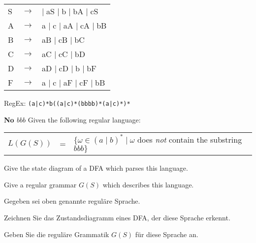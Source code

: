 \documentclass[a4paper]{exam}
\theoremstyle{remark}
\newenvironment{grammar}
	{\begin{tabular}[b]{lcl}}
	{\end{tabular}}
\newcommand{\rewritten}{$\to$}
\newcommand{\alternative}{$\mid \;$}
\begin{document}
\begin{questions}
	\begin{solution}
	
	\begin{grammar}
		S & \rewritten &  \alternative aS \alternative b \alternative bA \alternative cS \\
		A & \rewritten & a \alternative c \alternative aA \alternative cA \alternative bB \\
		B & \rewritten & aB \alternative cB \alternative bC \\
		C & \rewritten & aC \alternative cC \alternative bD \\
		D & \rewritten & aD \alternative cD \alternative b \alternative bF \\
		F & \rewritten & a \alternative c \alternative aF \alternative cF \alternative bB
	\end{grammar}
	
	RegEx: {\tt (a|c)*b((a|c)*(bbbb)*(a|c)*)*}
	
	\end{solution}

\question \textbf{No $bbb$}
	Given the following regular language:
	
	\begin{tabular}[b]{lcl}
		$L(G(S))$ & = & $\{\omega \in (a \mid b)^* \mid \omega$ does {\em not} contain the substring $bbb\}$
	\end{tabular}

	\begin{parts}
		\item Give the state diagram of a DFA which parses this language.

		\item Give a regular grammar $G(S)$ which describes this language.
		
	\end{parts}
	
	\begin{otherlanguage}{german}
		Gegeben sei oben genannte reguläre Sprache.
		
		\begin{parts}
		\item Zeichnen Sie das Zustandsdiagramm eines DFA, der diese Sprache erkennt.

		\item Geben Sie die reguläre Grammatik $G(S)$ für diese Sprache an.
		
	\end{parts}

	\end{otherlanguage}


\end{questions}
\end{document}
